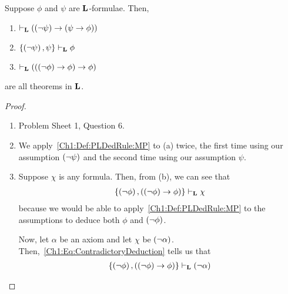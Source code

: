\begin{boxexample}
    Suppose $\phi$ and $\psi$ are $\mathbf{L}$-formulae. Then,
    \begin{enumerate}[label = \normalfont (\alph*)]
        \item $\vdash_{\mathbf{L}} \left( \left( \neg \psi \right) \to \left( \psi \to \phi \right) \right)$
        \item $\left\{ \left( \neg \psi \right), \psi \right\} \vdash_{\mathbf{L}} \phi$
        \item $\vdash_{\mathbf{L}} \left( \left( \left( \neg \phi \right) \to \phi \right) \to \phi \right)$
    \end{enumerate}
    are all theorems in $\mathbf{L}$.
    \begin{proof}
        \hfill
        \begin{enumerate}[label = (\alph*)]
            \item Problem Sheet 1, Question 6. \sorry
            
            \item We apply~\ref{Ch1:Def:PLDedRule:MP} to (a) twice, the first time using our assumption $\left( \neg \psi \right)$ and the second time using  our assumption $\psi$.
            
            \item Suppose $\chi$ is any formula. Then, from (b), we can see that
            \begin{align}
                \left\{ \left( \neg \phi \right), \left( \left( \neg \phi \right) \to \phi \right) \right\} \vdash_{\mathbf{L}} \chi
                \label{Ch1:Eq:ContradictoryDeduction}
            \end{align}
            because we would be able to apply~\ref{Ch1:Def:PLDedRule:MP} to the assumptions to deduce both $\phi$ and $\left( \neg \phi \right)$.
            
            Now, let $\alpha$ be an axiom and let $\chi$ be $\left( \neg \alpha \right)$. Then,~\eqref{Ch1:Eq:ContradictoryDeduction} tells us that
            \begin{align*}
                \left\{ \left( \neg \phi \right), \left( \left( \neg \phi \right) \to \phi \right) \right\} \vdash_{\mathbf{L}} \left( \neg \alpha \right)
            \end{align*}
            \sorry %
        \end{enumerate}
    \end{proof}
\end{boxexample}